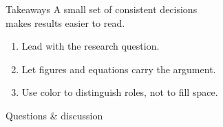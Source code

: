 \begin{frame}{Takeaways}
  \relax
  {\Large A small set of consistent decisions\\makes results easier to read.}\par
  \vspace{8mm}
  \begin{enumerate}
    \item Lead with the research question.
    \item Let figures and equations carry the argument.
    \item Use color to distinguish roles, not to fill space.
  \end{enumerate}
  \vfill
  {\color{pku-primary}\large Questions \& discussion}
\end{frame}
